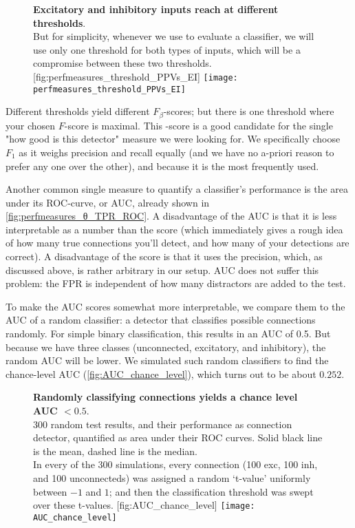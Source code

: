 \begin{figure}
    \begin{sidecaption}
        {\textbf{Excitatory and inhibitory inputs reach \maxF at different thresholds}.\\
        But for simplicity, whenever we use \maxF to evaluate a classifier, we will use only one threshold for both types of inputs, which will be a compromise between these two thresholds.}
        [fig:perfmeasures_threshold_PPVs_EI]
        \texttt{[image: perfmeasures\_threshold\_PPVs\_EI]}
    \end{sidecaption}
\end{figure}

Different thresholds yield different $F_β$-scores; but there is one threshold where your chosen $F$-score is maximal. This \maxF-score is a good candidate for the single "how good is this detector" measure we were looking for. We specifically choose $F_1$ as it weighs precision and recall equally (and we have no a-priori reason to prefer any one over the other), and because it is the most frequently used.

Another common single measure to quantify a classifier's performance is the area under its ROC-curve, or AUC, already shown in \cref{fig:perfmeasures_θ_TPR_ROC}. A disadvantage of the AUC is that it is less interpretable as a number than the \maxF score (which immediately gives a rough idea of how many true connections you'll detect, and how many of your detections are correct).
A disadvantage of the \maxF score is that it uses the precision, which, as discussed above, is rather arbitrary in our setup. AUC does not suffer this problem: the FPR is independent of how many distractors are added to the test.

To make the AUC scores somewhat more interpretable, we compare them to the AUC of a random classifier: a detector that classifies possible connections randomly. For simple binary classification, this results in an AUC of 0.5. But because we have three classes (unconnected, excitatory, and inhibitory), the random AUC will be lower. We simulated such random classifiers to find the chance-level AUC (\cref{fig:AUC_chance_level}), which turns out to be about $0.252$.

\begin{figure}
    \begin{sidecaption}
        {\textbf{Randomly classifying connections yields a chance level AUC $< 0.5$}.\\
        300 random test results, and their performance as connection detector, quantified as area under their ROC curves. Solid black line is the mean, dashed line is the median.\\
        In every of the 300 simulations, every connection (100 exc, 100 inh, and 100 unconnecteds) was assigned a random `t-value' uniformly between $-1$ and $1$; and then the classification threshold was swept over these t-values.}
        [fig:AUC_chance_level]
        \texttt{[image: AUC\_chance\_level]}
    \end{sidecaption}
\end{figure}



